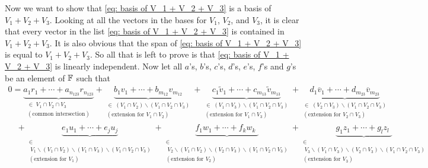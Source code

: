 \begin{xrcs}
Now we want to show that \eqref{eq: basis of V_1 + V_2 + V_3} is a basis of $V_1 + V_2 + V_3$. Looking at all the  vectors in the bases for $V_1$, $V_2$, and $V_3$, it is clear that every vector in the list \eqref{eq: basis of V_1 + V_2 + V_3} is contained in $V_1 + V_2 + V_3$. It is also obvious that the span of \eqref{eq: basis of V_1 + V_2 + V_3} is equal to $V_1 + V_2 + V_3$.
So all that is left to prove is that \eqref{eq: basis of V_1 + V_2 + V_3} is linearly independent. Now let all $a$'s, $b$'s, $c$'s, $d$'s, $e$'s, $f$'s and $g$'s be an element of $\mathbb{F}$ such that
\begin{equation}
  \label{eq: linear independence formula}
  \begin{aligned}
  0 = \underbrace{a_1r_1 + \cdots + a_{n_{123}} r_{n_{123}}}_{\substack{\in \; V_1 \cap V_2 \cap V_3 \\ (\text{common intersection})}}
  + \underbrace{b_1v_1 + \cdots + b_{m_{12}} v_{m_{12}}}_{
      \substack{\in \; (V_1 \cap V_2) \backslash (V_1 \cap V_2 \cap V_3) \\ (\text{extension for } V_1 \cap V_2)}}
  + \underbrace{c_1\widetilde{v}_1 + \cdots + c_{m_{13}}\widetilde{v}_{m_{13}}}_{
      \substack{\in \; (V_1 \cap V_3) \backslash (V_1 \cap V_2 \cap V_3) \\ (\text{extension for } V_1 \cap V_3)}}
  + \underbrace{d_1\overline{v}_1 + \cdots + d_{m_{23}}\overline{v}_{m_{23}}}_{
      \substack{\in \; (V_2 \cap V_3) \backslash (V_1 \cap V_2 \cap V_3) \\ (\text{extension for } V_2 \cap V_3)}} \\
  \quad
  + \underbrace{e_1 u_1 + \cdots + e_j u_j}_{
    \substack{\in \\ \; V_1 \backslash (V_1 \cap V_2 ) \backslash (V_1 \cap V_3) \backslash (V_1 \cap V_2 \cap V_3)  \\ (\text{extension for } V_1)}}
  + \underbrace{f_1 w_1 + \cdots + f_k w_k \phantom{_j}\!\!\!}_{
    \substack{\in \\  \; V_2 \backslash (V_1 \cap V_2 ) \backslash (V_2 \cap V_3) \backslash (V_1 \cap V_2 \cap V_3) \\ (\text{extension for } V_2)}}
  + \underbrace{g_1 z_1 + \cdots + g_l z_l \phantom{_j}\!\!\!}_{
    \substack{\in \\ \; V_3 \backslash (V_1 \cap V_3 ) \backslash (V_2 \cap V_3) \backslash (V_1 \cap V_2 \cap V_3) \\ (\text{extension for } V_3)}}
  \end{aligned}
\end{equation}



\end{xrcs}
